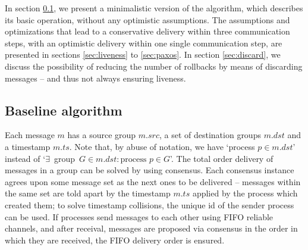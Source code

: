 \documentclass[times, 10pt]{article}
\begin{document}

In section \ref{sec:baseline}, we present a minimalistic version of the algorithm, which describes its basic operation, without any optimistic assumptions. The assumptions and optimizations that lead to a conservative delivery within three communication steps, with an optimistic delivery within one single communication step, are presented in sections \ref{sec:liveness} to \ref{sec:paxos}. In section \ref{sec:discard}, we discuss the possibility of reducing the number of rollbacks by means of discarding messages -- and thus not always ensuring liveness.

\subsection{Baseline algorithm}
\label{sec:baseline}

Each message $m$ has a source group $m.src$, a set of destination groups $m.dst$ and a timestamp $m.ts$. Note that, by abuse of notation, we have `process \mbox{$p \in m.dst$'} instead of `\mbox{$\exists$ group $G \in m.dst : \text{process }p \in G$'}. The total order delivery of messages in a group can be solved by using consensus. Each consensus instance agrees upon some message set as the next ones to be delivered -- messages within the same set are told apart by the timestamp $m.ts$ applied by the process which created them; to solve timestamp collisions, the unique id of the sender process can be used. If processes send messages to each other using FIFO reliable channels, and after receival, messages are proposed via consensus in the order in which they are received, the FIFO delivery order is ensured.
\end{document}

